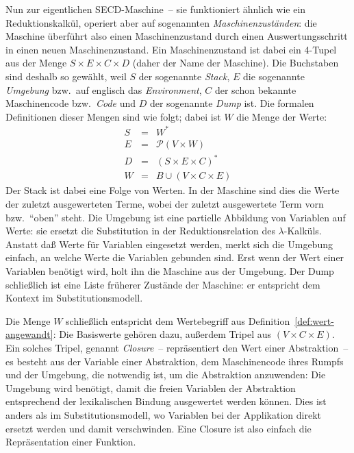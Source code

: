 Nun zur eigentlichen SECD-Maschine~-- sie funktioniert ähnlich wie ein
Reduktionskalkül, operiert aber auf sogenannten
\textit{Maschinenzuständen}: die Maschine überführt also einen
Maschinenzustand durch einen Auswertungsschritt in einen neuen
Maschinenzustand.  Ein Maschinenzustand ist dabei ein 4-Tupel aus der
Menge $S\times E\times C\times D$ (daher der Name der Maschine).  Die
Buchstaben sind deshalb so gewählt, weil $S$ der sogenannte
\textit{Stack}, $E$ die sogenannte
\textit{Umgebung} bzw.\ auf englisch das
\textit{Environment}, $C$ der schon bekannte
Maschinencode bzw.\ \textit{Code} und $D$ der
sogenannte \textit{Dump} ist.  Die formalen Definitionen
dieser Mengen sind wie folgt; dabei ist $W$ die Menge der Werte:
%
\begin{eqnarray*}
  S &=& W^\ast\\
  E &=& \mathcal{P}(V\times W)\\
  D &=& (S\times E \times C)^\ast\\
  W &=& B \cup (V\times C\times E)
\end{eqnarray*}
%
Der Stack ist dabei eine Folge von Werten.  In der Maschine sind dies
die Werte der zuletzt ausgewerteten Terme, wobei der zuletzt
ausgewertete Term vorn bzw.\ "`oben"' steht.  Die Umgebung ist eine
partielle Abbildung von Variablen auf Werte: sie ersetzt die
Substitution in der Reduktionsrelation des $\lambda$-Kalküls.  Anstatt
daß Werte für Variablen eingesetzt werden, merkt sich die Umgebung
einfach, an welche Werte die Variablen gebunden sind.  Erst wenn der
Wert einer Variablen benötigt wird, holt ihn die Maschine aus der
Umgebung.  Der Dump schließlich ist eine Liste früherer Zustände der
Maschine: er entspricht dem Kontext im
Substitutionsmodell.

Die Menge $W$ schließlich entspricht dem Wertebegriff aus
Definition~\ref{def:wert-angewandt}: Die Basiswerte gehören dazu,
außerdem Tripel aus $(V\times C\times E)$.  Ein solches Tripel,
genannt \textit{Closure}~-- repräsentiert den Wert
einer Abstraktion~-- es besteht aus der Variable einer Abstraktion,
dem Maschinencode ihres Rumpfs und der Umgebung, die notwendig ist, um
die Abstraktion anzuwenden: Die Umgebung wird benötigt, damit die
freien Variablen der Abstraktion entsprechend der lexikalischen
Bindung ausgewertet werden können.  Dies
ist anders als im Substitutionsmodell, wo Variablen bei der
Applikation direkt ersetzt werden und damit verschwinden.  Eine
Closure ist also einfach die Repräsentation einer Funktion.

